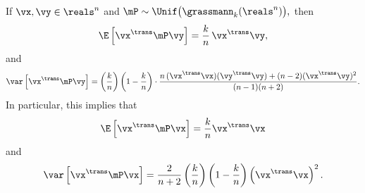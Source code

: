 \begin{lemma}
    If $\vx, \vy \in \reals^n$ and 
    \(
        \mP \sim \Unif\big( \grassmann_k (\reals^n) \big),
    \)
    then
    \[
        \E \left[ \vx^\trans \mP \vy \right] 
            = \frac{k}{n} \, \vx^\trans \vy,
    \]
    and
    \[
        \var \left[ \vx^\trans \mP \vy \right] 
            =
                \left( \frac{k}{n} \right)
                \left( 1 - \frac{k}{n} \right)
                \cdot 
                \frac{ n \, ( \vx^\trans \vx )( \vy^\trans \vy )
                       + (n-2) ( \vx^\trans \vy )^2 }
                     { (n-1) (n+2) }.
    \]
    In particular, this implies that
    \[
        \E \left[ \vx^\trans \mP \vx \right] 
        = 
        \frac{k}{n} \vx^\trans \vx
    \]
    and
    \[
        \var \left[ \vx^\trans \mP \vx \right]
        =
        \frac{ 2 }{ n+2 }
        \left( \frac{k}{n} \right)
        \left( 1 - \frac{k}{n} \right)
        \left( \vx^\trans \vx \right)^2.
    \]
\end{lemma}
